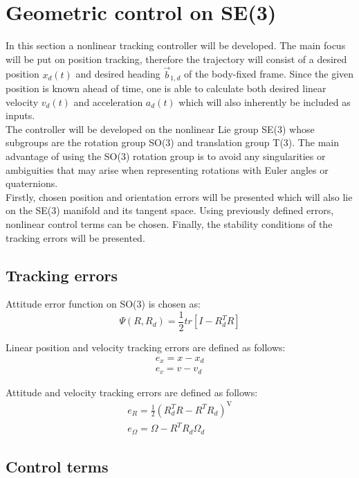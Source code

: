 \section{Geometric control on SE(3)}

In this section a nonlinear tracking controller will be developed. The main focus will be put on position tracking, therefore the trajectory will consist of a desired position $x_d(t)$ and desired heading $\vec{b}_{1,d}$ of the body-fixed frame. Since the given position is known ahead of time, one is able to calculate both desired linear velocity $v_d(t)$ and acceleration $a_d(t)$ which will also inherently be included as inputs. \\
The controller will be developed on the nonlinear Lie group SE(3) whose subgroups are the rotation group SO(3) and translation group T(3). The main advantage of using the SO(3) rotation group is to avoid any singularities or ambiguities that may arise when representing rotations with Euler angles or quaternions. \\
Firstly, chosen position and orientation errors will be presented which will also lie on the SE(3) manifold and its tangent space. Using previously defined errors, nonlinear control terms can be chosen. Finally, the stability conditions of the tracking errors will be presented.

\subsection{Tracking errors}

Attitude error function on SO(3) is chosen as:
\begin{equation}
	\Psi(R, R_d) = \frac{1}{2}tr[I - R_d^TR]
\end{equation}

Linear position and velocity tracking errors are defined as follows:
\begin{gather}
	e_x = x - x_d \\
	e_v = v - v_d
\end{gather}

Attitude and velocity tracking errors are defined as follows:
\begin{gather}
	e_R = \frac{1}{2}(R_d^TR - R^TR_d)^\text{V} \\
	e_\Omega = \Omega - R^TR_d\Omega_d
\end{gather}

\subsection{Control terms}

